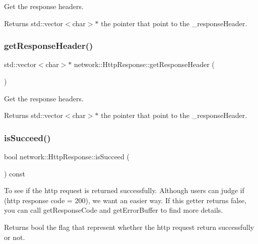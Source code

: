 Get the response headers. \begin{DoxyReturn}{Returns}
std\+::vector$<$char$>$$\ast$ the pointer that point to the \+\_\+response\+Header. 
\end{DoxyReturn}
\mbox{\label{classnetwork_1_1HttpResponse_a04a9c96a83fb6282cfe1462d0e3345d6}} 
\subsubsection{\texorpdfstring{get\+Response\+Header()}{getResponseHeader()}\hspace{0.1cm}{\footnotesize\ttfamily [2/2]}}
{\footnotesize\ttfamily std\+::vector$<$char$>$$\ast$ network\+::\+Http\+Response\+::get\+Response\+Header (\begin{DoxyParamCaption}{ }\end{DoxyParamCaption})\hspace{0.3cm}{\ttfamily [inline]}}

Get the response headers. \begin{DoxyReturn}{Returns}
std\+::vector$<$char$>$$\ast$ the pointer that point to the \+\_\+response\+Header. 
\end{DoxyReturn}
\mbox{\label{classnetwork_1_1HttpResponse_a3c1b4884e358688855ee21b8cd1bd0dd}} 
\subsubsection{\texorpdfstring{is\+Succeed()}{isSucceed()}\hspace{0.1cm}{\footnotesize\ttfamily [1/2]}}
{\footnotesize\ttfamily bool network\+::\+Http\+Response\+::is\+Succeed (\begin{DoxyParamCaption}{ }\end{DoxyParamCaption}) const\hspace{0.3cm}{\ttfamily [inline]}}

To see if the http request is returned successfully. Although users can judge if (http response code = 200), we want an easier way. If this getter returns false, you can call get\+Response\+Code and get\+Error\+Buffer to find more details. \begin{DoxyReturn}{Returns}
bool the flag that represent whether the http request return successfully or not. 
\end{DoxyReturn}
\mbox{\label{classnetwork_1_1HttpResponse_a3c1b4884e358688855ee21b8cd1bd0dd}} 
